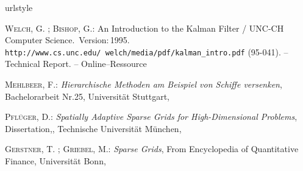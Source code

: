 \documentclass[a4paper,12pt]{llncs}
\numberwithin{equation}{section}
\begin{document}
\begin{thebibliography}{WB95}
	\providecommand{\url}[1]{\texttt{#1}}
	\expandafter\ifx\csname urlstyle\endcsname\relax
	\providecommand{\doi}[1]{doi: #1}\else
	\providecommand{\doi}{doi: \begingroup \urlstyle{rm}\Url}\fi
	
	\textsc{Welch}, G. ; \textsc{Bishop}, G.:
	\newblock An Introduction to the Kalman Filter  / UNC-CH Computer Science.
	\newblock \,Version:\,1995.
	\newblock  \url{http://www.cs.unc.edu/~welch/media/pdf/kalman_intro.pdf}
	(95-041). --
	\newblock Technical Report. --
	\newblock Online--Ressource
	
	\textsc{Mehlbeer}, F.:
	\newblock \textit{Hierarchische Methoden am Beispiel von Schiffe versenken},
	\newblock Bachelorarbeit Nr.25,
	\newblock Universität Stuttgart,
	
	\textsc{Pflüger}, D.:
	\newblock \textit{Spatially Adaptive Sparse Grids for High-Dimensional Problems},
	\newblock Dissertation,,
	\newblock Technische Universität München,
	
	\textsc{Gerstner}, T. ; \textsc{Griebel}, M.:
	\newblock \textit{Sparse Grids},
	\newblock From Encyclopedia of Quantitative Finance,
	\newblock Universität Bonn,
	
\end{thebibliography}


\end{document}
